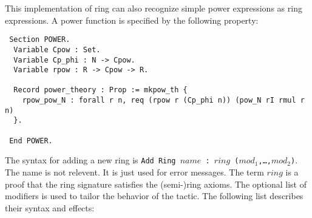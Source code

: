 This implementation of ring can also recognize simple 
power expressions as ring expressions. A power function is specified by 
the following property:
\begin{verbatim}
 Section POWER.
  Variable Cpow : Set.
  Variable Cp_phi : N -> Cpow.
  Variable rpow : R -> Cpow -> R. 
  
  Record power_theory : Prop := mkpow_th {
    rpow_pow_N : forall r n, req (rpow r (Cp_phi n)) (pow_N rI rmul r n)
  }.

 End POWER.
\end{verbatim}


The syntax for adding a new ring is {\tt Add Ring $name$ : $ring$
($mod_1$,\dots,$mod_2$)}.  The name is not relevent. It is just used
for error messages. The term $ring$ is a proof that the ring signature
satisfies the (semi-)ring axioms. The optional list of modifiers is
used to tailor the behavior of the tactic. The following list
describes their syntax and effects:
